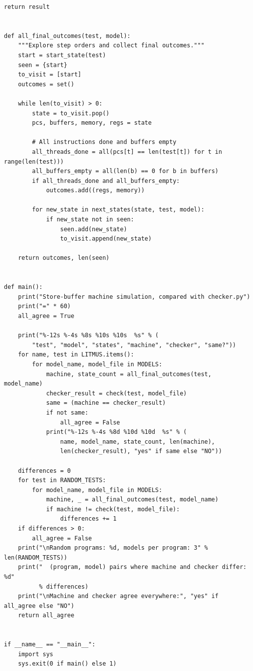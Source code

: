 \begin{lstlisting}[style=vspython]
    return result


def all_final_outcomes(test, model):
    """Explore step orders and collect final outcomes."""
    start = start_state(test)
    seen = {start}
    to_visit = [start]
    outcomes = set()

    while len(to_visit) > 0:
        state = to_visit.pop()
        pcs, buffers, memory, regs = state

        # All instructions done and buffers empty
        all_threads_done = all(pcs[t] == len(test[t]) for t in range(len(test)))
        all_buffers_empty = all(len(b) == 0 for b in buffers)
        if all_threads_done and all_buffers_empty:
            outcomes.add((regs, memory))

        for new_state in next_states(state, test, model):
            if new_state not in seen:
                seen.add(new_state)
                to_visit.append(new_state)

    return outcomes, len(seen)


def main():
    print("Store-buffer machine simulation, compared with checker.py")
    print("=" * 60)
    all_agree = True

    print("%-12s %-4s %8s %10s %10s  %s" % (
        "test", "model", "states", "machine", "checker", "same?"))
    for name, test in LITMUS.items():
        for model_name, model_file in MODELS:
            machine, state_count = all_final_outcomes(test, model_name)
            checker_result = check(test, model_file)
            same = (machine == checker_result)
            if not same:
                all_agree = False
            print("%-12s %-4s %8d %10d %10d  %s" % (
                name, model_name, state_count, len(machine),
                len(checker_result), "yes" if same else "NO"))

    differences = 0
    for test in RANDOM_TESTS:
        for model_name, model_file in MODELS:
            machine, _ = all_final_outcomes(test, model_name)
            if machine != check(test, model_file):
                differences += 1
    if differences > 0:
        all_agree = False
    print("\nRandom programs: %d, models per program: 3" % len(RANDOM_TESTS))
    print("  (program, model) pairs where machine and checker differ: %d"
          % differences)
    print("\nMachine and checker agree everywhere:", "yes" if all_agree else "NO")
    return all_agree


if __name__ == "__main__":
    import sys
    sys.exit(0 if main() else 1)
\end{lstlisting}

